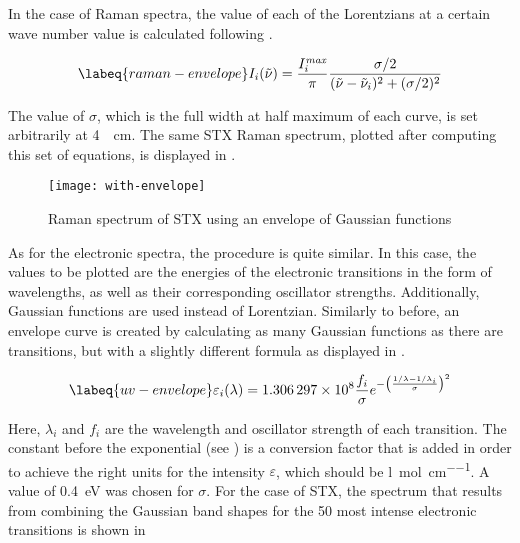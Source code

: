 In the case of Raman spectra, the value of each of the Lorentzians at a certain wave number value is calculated following .

\begin{equation}
    \labeq{raman-envelope}
    I_i (\tilde{\nu}) = \frac{I_i^\textit{max}}{\pi}\frac{\sigma /2}{(\tilde{\nu} - \tilde{\nu}_i)^2+(\sigma/2)^2}
\end{equation}

The value of $\sigma$, which is the full width at half maximum of each curve, is set arbitrarily at \SI{4}{\per\cm}.
The same STX Raman spectrum, plotted after computing this set of equations, is displayed in .

\begin{figure}
    \centering
    \texttt{[image: with-envelope]}
    \caption[Raman spectrum with Gaussian envelope]{Raman spectrum of STX using an envelope of Gaussian functions}
\end{figure}

As for the electronic spectra, the procedure is quite similar.
In this case, the values to be plotted are the energies of the electronic transitions in the form of wavelengths, as well as their corresponding oscillator strengths.
Additionally, Gaussian functions are used instead of Lorentzian.
Similarly to before, an envelope curve is created by calculating as many Gaussian functions as there are transitions, but with a slightly different formula as displayed in .

\begin{equation}
    \labeq{uv-envelope}
    \varepsilon_i (\lambda) = \num{1.306297e8} \frac{f_i}{\sigma} e^{-\left(\frac{1/\lambda - 1/\lambda_i}{\sigma}\right)^2}
\end{equation}

Here, $\lambda_i$ and $f_i$ are the wavelength and oscillator strength of each transition. The constant before the exponential (see ) is a conversion factor that is added in order to achieve the right units for the intensity $\varepsilon$, which should be \si{\litre\per\mole\per\cm}.
A value of \SI{0.4}{\eV} was chosen for $\sigma$.
For the case of STX, the spectrum that results from combining the Gaussian band shapes for the 50 most intense electronic transitions is shown in 

